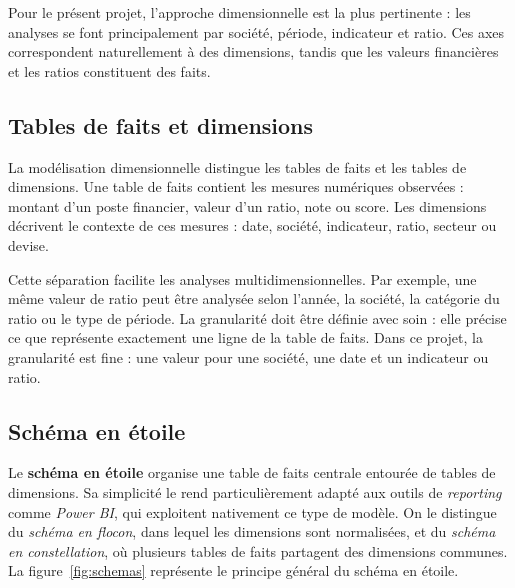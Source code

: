 \par Pour le présent projet, l'approche dimensionnelle est la plus pertinente :
les analyses se font principalement par société, période, indicateur et ratio.
Ces axes correspondent naturellement à des dimensions, tandis que les valeurs
financières et les ratios constituent des faits.

\subsection{Tables de faits et dimensions}
\par La modélisation dimensionnelle distingue les tables de faits et les tables
de dimensions. Une table de faits contient les mesures numériques observées :
montant d'un poste financier, valeur d'un ratio, note ou score. Les dimensions
décrivent le contexte de ces mesures : date, société, indicateur, ratio, secteur
ou devise.

\par Cette séparation facilite les analyses multidimensionnelles. Par exemple,
une même valeur de ratio peut être analysée selon l'année, la société, la
catégorie du ratio ou le type de période. La granularité doit être définie avec
soin : elle précise ce que représente exactement une ligne de la table de faits.
Dans ce projet, la granularité est fine : une valeur pour une société, une date
et un indicateur ou ratio.

\subsection{Schéma en étoile}
\par Le \textbf{schéma en étoile} organise une table de faits centrale entourée
de tables de dimensions. Sa simplicité le rend particulièrement adapté aux
outils de \textit{reporting} comme \textit{Power BI}, qui exploitent nativement
ce type de modèle. On le distingue du \textit{schéma en flocon}, dans lequel les
dimensions sont normalisées, et du \textit{schéma en constellation}, où plusieurs
tables de faits partagent des dimensions communes. La figure~\ref{fig:schemas}
représente le principe général du schéma en étoile.

